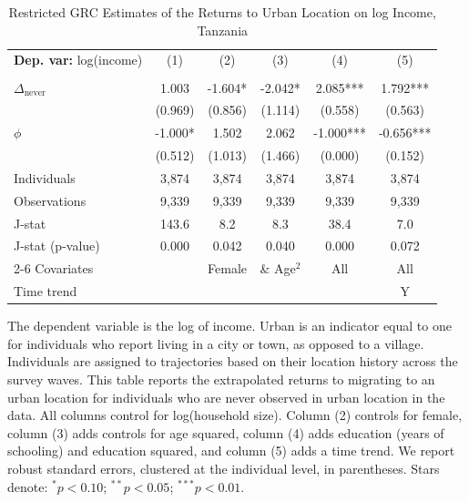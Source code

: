 \begin{table}[htbp] \centering \begin{threeparttable}
 \caption{Restricted GRC Estimates of the Returns to Urban Location on log Income, Tanzania} 
 \label{tab:GRC_TZA_income_urban_unb} 
\begin{tabular}{l ccccc} \toprule  \textbf{Dep. var:}  log(income) 
                    &\multicolumn{1}{c}{(1)}   &\multicolumn{1}{c}{(2)}   &\multicolumn{1}{c}{(3)}   &\multicolumn{1}{c}{(4)}   &\multicolumn{1}{c}{(5)}   \\
                    &               &               &               &               &               \\
\addlinespace
$\Delta_{\text{never}}$&    1.003   &      -1.604*  &      -2.042*  &       2.085***&       1.792***\\
                    &     (0.969)   &     (0.856)   &     (1.114)   &     (0.558)   &     (0.563)   \\
\addlinespace
$\phi$              &      -1.000*  &       1.502   &       2.062   &      -1.000***&      -0.656***\\
                    &     (0.512)   &     (1.013)   &     (1.466)   &     (0.000)   &     (0.152)   \\
\addlinespace
Individuals         &       3,874   &       3,874   &       3,874   &       3,874   &       3,874   \\
Observations        &       9,339   &       9,339   &       9,339   &       9,339   &       9,339   \\
J-stat              &       143.6   &         8.2   &         8.3   &        38.4   &         7.0   \\
J-stat (p-value)    &       0.000   &       0.042   &       0.040   &       0.000   &       0.072   \\
\cmidrule{2-6} Covariates & & Female & \& Age$^2$ & All & All  \\ Time trend & & & & & Y \\ \bottomrule \end{tabular} \begin{tablenotes} \footnotesize \item{The dependent variable is the log of income. Urban is an indicator equal to one for individuals who report living in a city or town, as opposed to a village. Individuals are assigned to trajectories based on their location history across the survey waves. This table reports the extrapolated returns to migrating to an urban location for individuals who are never observed in urban location in the data. %
All columns control for log(household size). Column (2) controls for female, column (3) adds controls for age squared, column (4) adds education (years of schooling) and education squared, and column (5) adds a time trend.  We report robust standard errors, clustered at the individual level, in parentheses. Stars denote: $^{*} p<0.10$; $^{**} p<0.05$; $^{***} p<0.01$.} \end{tablenotes} \end{threeparttable} \end{table}
